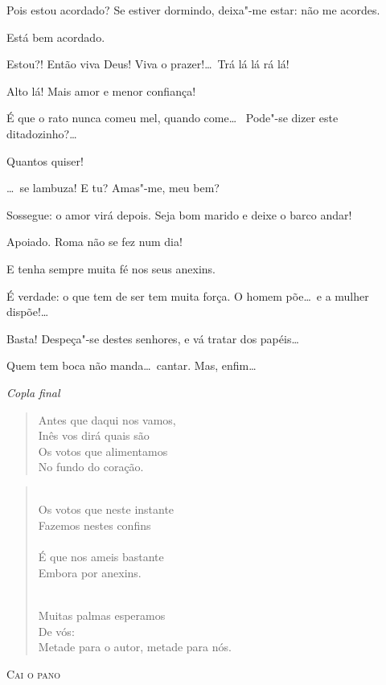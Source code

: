   Pois estou acordado? Se estiver dormindo, deixa"-me estar: não me
acordes.

  Está bem acordado.

  Estou?!  Então viva Deus! Viva o
prazer!\ldots\ Trá lá lá rá lá! 

   Alto lá! Mais amor e menor confiança!

  É que o rato nunca comeu mel, quando come\ldots\ 
Pode"-se dizer este ditadozinho?\ldots

  Quantos quiser!

   \ldots\ se lambuza!   E tu? Amas"-me, meu bem?

  Sossegue: o amor virá depois. Seja bom marido e deixe o
barco andar!

  Apoiado. Roma não se fez num dia!

  E tenha sempre muita fé nos seus anexins.

  É verdade: o que tem de ser tem muita força. O homem põe\ldots\
e a mulher dispõe!\ldots

  Basta! Despeça"-se destes senhores, e vá tratar dos papéis\ldots

  Quem tem boca não manda\ldots\ cantar. Mas, enfim\ldots\ 
\smallskip


{\smallskip\raggedleft\itshape Copla final\par}
\begin{verse} 
Antes que daqui nos vamos,\\
Inês vos dirá quais são\\
Os votos que alimentamos\\
No fundo do coração.  
\end{verse}

\begin{verse}
\\
Os votos que neste instante\\
Fazemos nestes confins\\
\\
É que nos ameis bastante\\
Embora por anexins.

\\
Muitas palmas esperamos\\
\quad De vós:\\
Metade para o autor, metade para nós.
\end{verse}

\vspace{1cm}

\begin{center}
\textsc{Cai o pano}
\end{center}

